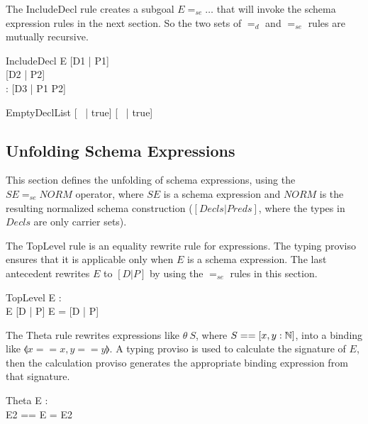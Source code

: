 \documentclass{entcs}
\newcommand{\sexprUnfoldsTo}{\mathrel{=_{se}}}
\newcommand{\declListUnfoldsTo}{\mathrel{=_d}}
\begin{document}
The IncludeDecl rule creates a subgoal $E \sexprUnfoldsTo \ldots$ that
will invoke the schema expression rules in the next section.  So the
two sets of $\declListUnfoldsTo$ and $\sexprUnfoldsTo$ rules are
mutually recursive.

\begin{zedrule}{IncludeDecl}
   E \sexprUnfoldsTo [D1 | P1] \\
   [D | true] \declListUnfoldsTo [D2 | P2] \\
   \proviso [D1 | true] \land [D2 | true] : \power [D3]
\derives
   [E; D | true] \declListUnfoldsTo [D3 |  P1 \land P2]
\end{zedrule}

\begin{zedrule}{EmptyDeclList}
   [~ | true] \declListUnfoldsTo [~ | true]
\end{zedrule}


\subsection{Unfolding Schema Expressions}

This section defines the unfolding of schema expressions,
using the $SE \sexprUnfoldsTo NORM$ operator, where $SE$
is a schema expression and $NORM$ is the resulting normalized
schema construction ($[Decls|Preds]$, where the types in $Decls$
are only carrier sets).

The TopLevel rule is an equality rewrite rule for expressions.
The typing proviso ensures that it is applicable only when $E$
is a schema expression.  The last antecedent rewrites $E$ to
$[D | P]$ by using the $\sexprUnfoldsTo$ rules in this section.

\begin{zedrule}{TopLevel}
  \proviso E : \power [D2] \\
  E  \sexprUnfoldsTo [D | P]
\derives
  E = [D | P]
\end{zedrule}

The Theta rule rewrites expressions like $\theta~S$, where
$S==[x,y:{\mathbb N}]$, into a binding like $\lblot x==x,y==y \rblot$.
A typing proviso is used to calculate the signature of $E$, then
the calculation proviso generates the appropriate binding expression
from that signature.
\begin{zedrule}{Theta}
  \proviso E : \power [D] \\
  \proviso E2 == \theta [D | true]
\derives
  \theta E = E2
\end{zedrule}
\end{document}
